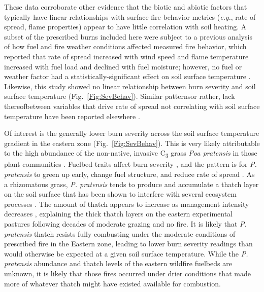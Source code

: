 \documentclass[fire,article,submit,oneauthor,pdftex]{Definitions/mdpi}
\begin{document}
 These data corroborate other evidence that the biotic and abiotic factors that typically have linear relationships with surface fire behavior metrics (\emph{e.g.}, rate of spread, flame properties) appear to have little correlation with soil heating. 
A subset of the prescribed burns included here were subject to a previous analysis of how fuel and fire weather conditions affected measured fire behavior, which reported that rate of spread increased with wind speed and flame temperature increased with fuel load and declined with fuel moisture; however, no fuel or weather factor had a statistically-significant effect on soil surface temperature \cite{mcgranahan2023}.
Likewise, this study showed no linear relationship between burn severity and soil surface temperature (Fig.~\ref{Fig:SevBehav}).
Similar patterns\textemdash or rather, lack thereof\textemdash between variables that drive rate of spread not correlating with soil surface temperature have been reported elsewhere \cite{gimeno-garcia2004}. 

Of interest is the generally lower burn severity across the soil surface temperature gradient in the eastern zone (Fig.~\ref{Fig:SevBehav}).
This is very likely attributable to the high abundance of the non-native, invasive C\textsubscript{3} grass \emph{Poa pratensis} in those plant communities \cite{duquette2022}.
Fuelbed traits affect burn severity \cite{schwilk2011}, and the pattern is for \emph{P. pratensis} to green up early, change fuel structure, and reduce rate of spread \cite{yurkonis2019}. 
As a rhizomatous grass, \emph{P. pratensis} tends to produce and accumulate a thatch layer on the soil surface that has been shown to interfere with several ecosystem processes \cite{bosy1995,nouwakpo2019, gerhard2022, kjaer2025}. 
The amount of thatch appears to increase as management intensity decreases \cite{shearman1980, kjaer2025}, explaining the thick thatch layers on the eastern experimental pastures following decades of moderate grazing and no fire.
It is likely that \emph{P. pratensis} thatch resists fully combusting under the moderate conditions of prescribed fire in the Eastern zone, leading to lower burn severity readings than would otherwise be expected at a given soil surface temperature. 
While the \emph{P. pratensis} abundance and thatch levels of the eastern wildfire fuelbeds are unknown, it is likely that those fires occurred under drier conditions that made more of whatever thatch might have existed available for combustion. 
\end{document}
